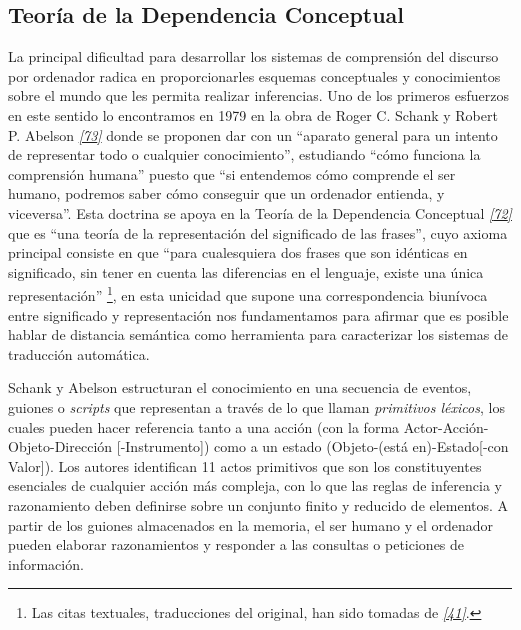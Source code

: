 \documentclass[a4paper,12pt,spanish]{book}
\begin{document}
\subsection{Teoría de la Dependencia Conceptual}
\label{1.state-of-the-art/i.representacion-conocimiento:teoria-de-la-dependencia-conceptual}\label{1.state-of-the-art/i.representacion-conocimiento:teoria-dependencia-conceptual}
La principal dificultad para desarrollar los sistemas de comprensión del discurso por
ordenador radica en proporcionarles esquemas conceptuales y conocimientos sobre el
mundo que les permita realizar inferencias. Uno de los primeros esfuerzos en este sentido
lo encontramos en 1979 en la obra de Roger C. Schank y Robert P. Abelson \label{1.state-of-the-art/i.representacion-conocimiento:id4}{\hyperref[zreferences:schank1977]{\emph{{[}73{]}}}}
donde se proponen dar con un ``aparato general para un intento de representar todo o cualquier
conocimiento'', estudiando ``cómo funciona la comprensión humana'' puesto que ``si entendemos
cómo comprende el ser humano, podremos saber cómo conseguir que un ordenador entienda,
y viceversa''. Esta doctrina se apoya en la Teoría de la Dependencia Conceptual
\label{1.state-of-the-art/i.representacion-conocimiento:id5}{\hyperref[zreferences:schank1969]{\emph{{[}72{]}}}} que es ``una teoría de la representación del significado de las frases'',
cuyo axioma principal consiste en que ``para cualesquiera dos frases que son idénticas en
significado, sin tener en cuenta las diferencias en el lenguaje, existe una única
representación'' \footnote{
Las citas textuales, traducciones del original, han sido tomadas
de \label{1.state-of-the-art/i.representacion-conocimiento:id8}{\hyperref[zreferences:izquierdoarroyo1995]{\emph{{[}41{]}}}}.
}, en esta unicidad que supone una correspondencia biunívoca entre
significado y representación nos fundamentamos para afirmar que es posible hablar de
distancia semántica como herramienta para caracterizar los sistemas de traducción
automática.

Schank y Abelson estructuran el conocimiento en una secuencia de eventos,
guiones o \emph{scripts} que representan a través de lo que llaman \emph{primitivos léxicos}, los cuales
pueden hacer referencia tanto a una acción (con la forma Actor-Acción-Objeto-Dirección
{[}-Instrumento{]}) como a un estado (Objeto-(está en)-Estado{[}-con Valor{]}). Los autores
identifican 11 actos primitivos que son los constituyentes esenciales de cualquier acción
más compleja, con lo que las reglas de inferencia y razonamiento deben definirse sobre
un conjunto finito y reducido de elementos. A partir de los guiones almacenados en la
memoria, el ser humano y el ordenador pueden elaborar razonamientos y responder a las
consultas o peticiones de información.
\end{document}
